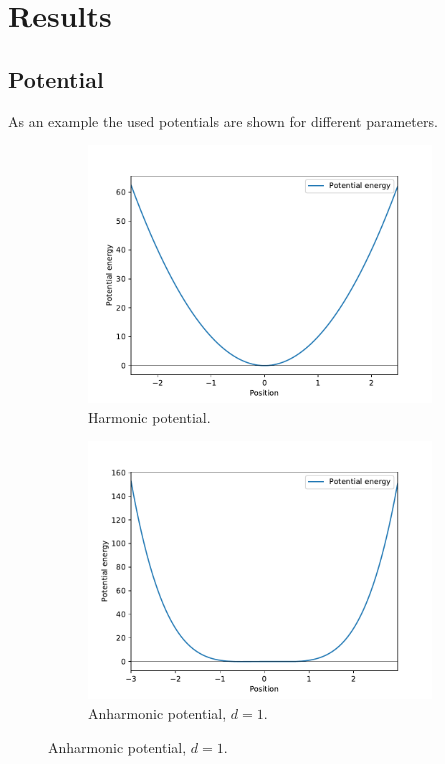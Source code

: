 \documentclass{scrartcl}
\begin{document}
	\section{Results}
	\subsection{Potential}
		As an example the used potentials are shown for different parameters.
		\begin{figure}[H]
			\centering
			\begin{subfigure}[c]{0.32\textwidth}
				\includegraphics[width=\textwidth]{../imgs/potential/harm_0_0.pdf}
				\caption{Harmonic potential.\newline}
				\label{fig:potential_harm0}
			\end{subfigure}
			\begin{subfigure}[c]{0.32\textwidth}
				\includegraphics[width=\textwidth]{../imgs/potential/anharm_1_0.pdf}
				\caption{Anharmonic potential, \newline$d=1$.}
				\label{fig:potential_anharm1}
			\end{subfigure}


\end{figure}
\end{document}
